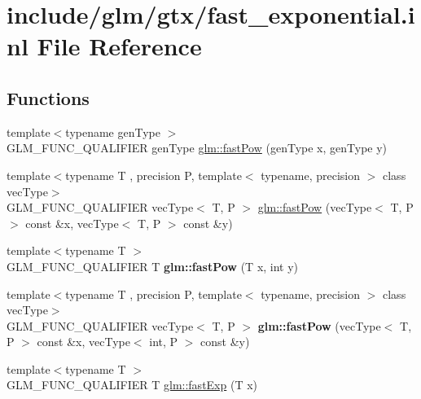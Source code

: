 \hypertarget{fast__exponential_8inl}{}\section{include/glm/gtx/fast\+\_\+exponential.inl File Reference}
\label{fast__exponential_8inl}
\subsection*{Functions}
\begin{DoxyCompactItemize}
\item 
{\footnotesize template$<$typename gen\+Type $>$ }\\G\+L\+M\+\_\+\+F\+U\+N\+C\+\_\+\+Q\+U\+A\+L\+I\+F\+I\+ER gen\+Type \hyperlink{group__gtx__fast__exponential_ga5340e98a11fcbbd936ba6e983a154d50}{glm\+::fast\+Pow} (gen\+Type x, gen\+Type y)
\item 
{\footnotesize template$<$typename T , precision P, template$<$ typename, precision $>$ class vec\+Type$>$ }\\G\+L\+M\+\_\+\+F\+U\+N\+C\+\_\+\+Q\+U\+A\+L\+I\+F\+I\+ER vec\+Type$<$ T, P $>$ \hyperlink{group__gtx__fast__exponential_ga07b73976a9af4005945bc338b45d8466}{glm\+::fast\+Pow} (vec\+Type$<$ T, P $>$ const \&x, vec\+Type$<$ T, P $>$ const \&y)
\item 
\mbox{\label{fast__exponential_8inl_a5a5fcbdc3b4ecfaddf5c66774259bcd3}} 
{\footnotesize template$<$typename T $>$ }\\G\+L\+M\+\_\+\+F\+U\+N\+C\+\_\+\+Q\+U\+A\+L\+I\+F\+I\+ER T {\bfseries glm\+::fast\+Pow} (T x, int y)
\item 
\mbox{\label{fast__exponential_8inl_a5afa4ee352971a9d5ce538f4370074e9}} 
{\footnotesize template$<$typename T , precision P, template$<$ typename, precision $>$ class vec\+Type$>$ }\\G\+L\+M\+\_\+\+F\+U\+N\+C\+\_\+\+Q\+U\+A\+L\+I\+F\+I\+ER vec\+Type$<$ T, P $>$ {\bfseries glm\+::fast\+Pow} (vec\+Type$<$ T, P $>$ const \&x, vec\+Type$<$ int, P $>$ const \&y)
\item 
{\footnotesize template$<$typename T $>$ }\\G\+L\+M\+\_\+\+F\+U\+N\+C\+\_\+\+Q\+U\+A\+L\+I\+F\+I\+ER T \hyperlink{group__gtx__fast__exponential_gaa3180ac8f96ab37ab96e0cacaf608e10}{glm\+::fast\+Exp} (T x)
\item 

\end{DoxyCompactItemize}

